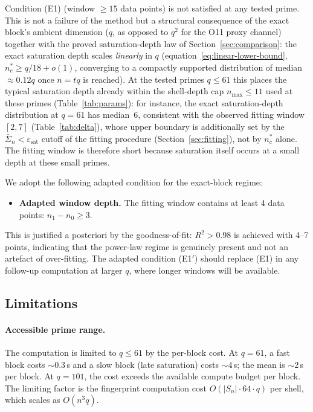     Condition (E1) (window $\geq 15$ data points) is not satisfied at any tested prime.
    This is not a failure of the method but a structural consequence of the exact block's
    ambient dimension ($q$, as opposed to $q^2$ for the O11 proxy channel) together with the
    proved saturation-depth law of Section~\ref{sec:comparison}: the exact saturation depth
    scales \emph{linearly} in $q$ (equation~\eqref{eq:linear-lower-bound},
    $n_c^*\geq q/18+o(1)$, converging to a compactly supported distribution of median
    $\approx 0.12q$ once $n=tq$ is reached).
    At the tested primes $q\leq 61$ this places the typical saturation depth already within
    the shell-depth cap $n_{\max}\leq 11$ used at these primes (Table~\ref{tab:params}):
    for instance, the exact saturation-depth distribution at $q=61$ has median~$6$,
    consistent with the observed fitting window $[2,7]$ (Table~\ref{tab:delta}), whose upper
    boundary is additionally set by the $\bar\Sigma_n<\varepsilon_{\mathrm{sat}}$ cutoff of
    the fitting procedure (Section~\ref{sec:fitting}), not by $n_c^*$ alone.
    The fitting window is therefore short because saturation itself occurs at a small depth
    at these small primes.

    We adopt the following adapted condition for the exact-block regime:
    \begin{itemize}
      \item[\textbf{(E1$'$)}] \textbf{Adapted window depth.}
      The fitting window contains at least 4 data points: $n_1 - n_0 \geq 3$.
    \end{itemize}
    This is justified a posteriori by the goodness-of-fit: $R^2 > 0.98$ is achieved
    with 4--7 points, indicating that the power-law regime is genuinely present
    and not an artefact of over-fitting.
    The adapted condition (E1$'$) should replace (E1) in any follow-up computation
    at larger $q$, where longer windows will be available.

  \subsection{Limitations}

    \paragraph{Accessible prime range.}
      The computation is limited to $q \leq 61$ by the per-block cost.
      At $q = 61$, a fast block costs $\sim 0.3$\,s and a slow block (late saturation)
      costs $\sim 4$\,s; the mean is $\sim 2$\,s per block.
      At $q = 101$, the cost exceeds the available compute budget per block.
      The limiting factor is the fingerprint computation cost $O(|S_n|\cdot 64 \cdot q)$
      per shell, which scales as $O(n^3 q)$.

